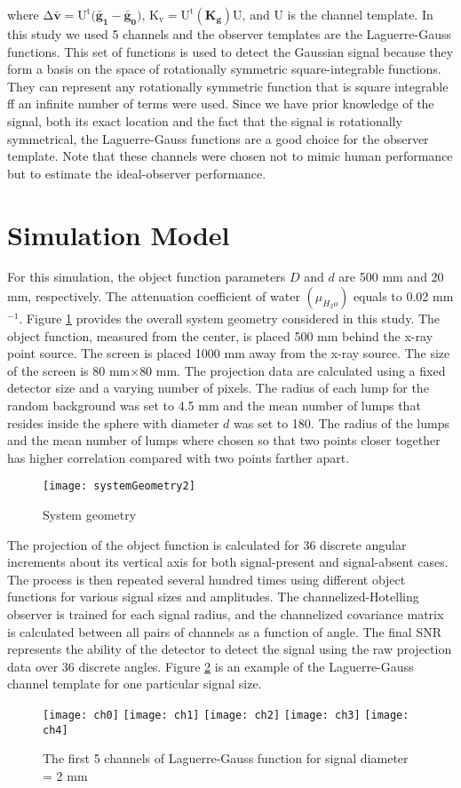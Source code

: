 where $\mathrm{\Delta \mathbf{\bar{v}} = U^t(\mathbf{\bar{g}_1}-\mathbf{\bar{g}_0)}}$, $\mathrm{K_v= U^t(\mathbf{K_g})U}$, and $\mathrm{U}$ is the channel template.  In this study we used 5 channels and the observer templates are the Laguerre-Gauss functions.  This set of functions is used to detect the Gaussian signal because they form a basis on the space of rotationally symmetric square-integrable functions.  They can represent any rotationally symmetric function that is square integrable ff an infinite number of terms were used.  Since we have prior knowledge of the signal, both its exact location and the fact that the signal is rotationally symmetrical, the Laguerre-Gauss functions are a good choice for the observer template.  Note that these channels were chosen not to mimic human performance but to estimate the ideal-observer performance.

\section{Simulation Model}
For this simulation, the object function parameters $D$ and $d$ are 500 mm and 20 mm, respectively.  The attenuation coefficient of water $(\mu_{H_2o})$ equals to 0.02 mm$^{-1}$.  Figure \ref{fig:system geometry} provides the overall system geometry considered in this study.  The object function, measured from the center, is placed 500 mm behind the x-ray point source.  The screen is placed 1000 mm away from the x-ray source.  The size of the screen is 80 mm$\times$80 mm.  The projection data are calculated using a fixed detector size and a varying number of pixels.  The radius of each lump for the random background was set to 4.5 mm and the mean number of lumps that resides inside the sphere with diameter $d$ was set to 180.  The radius of the lumps and the mean number of lumps where chosen so that two points closer together has higher correlation compared with two points farther apart.
%
\begin{figure}
\texttt{[image: systemGeometry2]}
\caption{System geometry}
\label{fig:system geometry}
\end{figure} 
%
The projection of the object function is calculated for 36 discrete angular increments about its vertical axis for both signal-present and signal-absent cases.  The process is then repeated several hundred times using different object functions for various signal sizes and amplitudes.  The channelized-Hotelling observer is trained for each signal radius, and the channelized covariance matrix is calculated between all pairs of channels as a function of angle.  The final SNR represents the ability of the detector to detect the signal using the raw projection data over 36 discrete angles.  Figure \ref{fig: channel template} is an example of the Laguerre-Gauss channel template for one particular signal size.
%
\begin{figure}[ht]
\texttt{[image: ch0]}
\texttt{[image: ch1]}
\texttt{[image: ch2]}
\texttt{[image: ch3]}
\texttt{[image: ch4]} 
\caption{The first 5 channels of Laguerre-Gauss function for signal diameter = 2 mm}
\label{fig: channel template} 
\end{figure}

